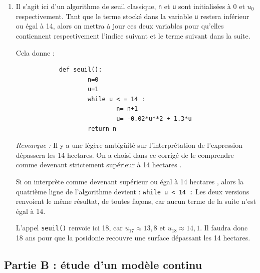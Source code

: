 \documentclass[10pt]{article}
\providecommand{\np}[2][]{{#2~#1}}
\begin{document}
\begin{enumerate}
\begin{enumerate}
		L'intervalle $]14 ~;~ +\infty[$ est un tel intervalle, donc il existe un rang $N_0$ à partir duquel les termes de la suite sont dans l'intervalle $]14 ~;~ +\infty[$, et sont donc supérieurs à 14.

		Il existe donc une année à partir de laquelle la posidonie recouvrira une surface dépassant les \np[ha]{14}.

		\item Il s'agit ici d'un algorithme de seuil classique, \texttt{n} et \texttt{u} sont initialisées à 0 et $u_0$ respectivement. Tant que le terme stocké dans la variable \texttt{u} restera inférieur ou égal à 14, alors on mettra à jour ces deux variables pour qu'elles contiennent respectivement l'indice suivant et le terme suivant dans la suite.

		Cela donne :

		\begin{verbatim}
			def seuil():
					n=0
					u=1
					while u < = 14 :
							n= n+1
							u= -0.02*u**2 + 1.3*u
					return n
		\end{verbatim}

	\emph{Remarque :} Il y a une légère ambigüité sur l'interprétation de l'expression \og dépassera les 14 hectares\fg{}. On a choisi dans ce corrigé de le comprendre comme \og devenant strictement supérieur à 14 hectares \fg{}.

	Si on interprète comme \og devenant supérieur ou égal à 14 hectares \fg{}, alors la quatrième ligne de l'algorithme devient : \quad \texttt{while u < 14 :}
	Les deux versions renvoient le même résultat, de toutes façons, car aucun terme de la suite n'est égal à 14.

	L'appel \texttt{seuil()} renvoie ici 18, car $u_{17} \approx 13,8$ et $u_{18} \approx 14,1$. Il faudra donc 18 ans pour que la posidonie recouvre une surface dépassant les 14 hectares.
	\end{enumerate}
\end{enumerate}

\subsection*{Partie B : étude d'un modèle continu}
\end{document}
